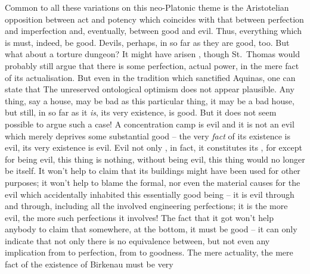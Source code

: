 Common to all these variations on this neo-Platonic theme is the Aristotelian
opposition between act and potency which coincides with that between perfection
and imperfection and, eventually, between good and evil. Thus, everything which
 is must, indeed, be good.  Devils, perhaps, in so far as they
 are good, too. But what about a torture dungeon? It might have arisen
, though St.~Thomas would probably
still argue that there is some perfection, actual power, in the mere fact of its
actualisation.  But even in the tradition which sanctified Aquinas, one can
state that   The unreserved ontological optimism does not
appear plausible. 
Any thing, say a house, may be bad as this particular thing, it may be a bad
house, but still, in so far as it {\em is}, its very existence, is good. But it
does not seem possible to argue such a case!  A concentration camp is evil and
it is not an evil which merely deprives some substantial good -- the very {\em
  fact} of its existence is evil, its very existence is evil. Evil not only
, in fact, it constitutes its
, for except for being evil, this thing is nothing,
without being evil, this thing would no longer be itself. It won't help to claim
that its buildings might have been used for other purposes; it won't help to
blame the formal, nor even the material causes for the evil which accidentally
inhabited this essentially good being -- it is evil through and through,
including all the involved engineering perfections; it is the more evil, the
more such perfections it involves!  The fact that it got  won't
help anybody to claim that somewhere, at the bottom, it must be good -- it can
only indicate that not only there is no equivalence between, but not even any
implication from  to perfection, from  to goodness.  The
mere actuality, the mere fact of the existence of Birkenau must be very

